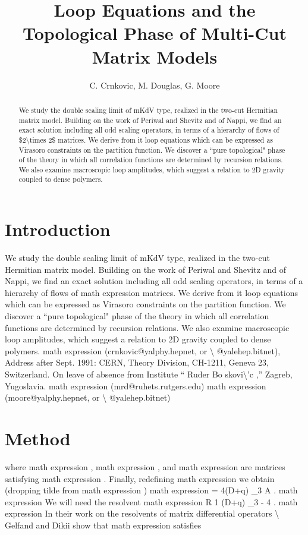 \documentclass[11pt]{article}
\title{Loop Equations and the Topological Phase of Multi-Cut Matrix Models}
\author{C. Crnkovic, M. Douglas, G. Moore}
\date{}
\begin{document}
\maketitle
\begin{abstract}

We study the double scaling limit of mKdV type, realized in the two-cut Hermitian matrix model. Building on the work of Periwal and Shevitz and of Nappi, we find an exact solution including all odd scaling operators, in terms of a hierarchy of flows of \$2\textbackslash{}times 2\$ matrices. We derive from it loop equations which can be expressed as Virasoro constraints on the partition function. We discover a ``pure topological" phase of the theory in which all correlation functions are determined by recursion relations. We also examine macroscopic loop amplitudes, which suggest a relation to 2D gravity coupled to dense polymers.

\end{abstract}

\section{Introduction}

We study the double scaling limit of mKdV type, realized in the two-cut Hermitian matrix model. Building on the work of Periwal and Shevitz and of Nappi, we find an exact solution including all odd scaling operators, in terms of a hierarchy of flows of math expression matrices. We derive from it loop equations which can be expressed as Virasoro constraints on the partition function. We discover a ``pure topological" phase of the theory in which all correlation functions are determined by recursion relations. We also examine macroscopic loop amplitudes, which suggest a relation to 2D gravity coupled to dense polymers. math expression (crnkovic@yalphy.hepnet, or \textbackslash{} @yalehep.bitnet), Address after Sept. 1991: CERN, Theory Division, CH-1211, Geneva 23, Switzerland. On leave of absence from Institute `` Ruder Bo skovi\textbackslash{}'c ,'' Zagreb, Yugoslavia. math expression (mrd@ruhets.rutgers.edu) math expression (moore@yalphy.hepnet, or \textbackslash{} @yalehep.bitnet)

\section{Method}

where math expression , math expression , and math expression are matrices satisfying math expression . Finally, redefining math expression we obtain (dropping tilde from math expression ) math expression = 4(D+q) \_3 A . math expression We will need the resolvent math expression R 1 (D+q) \_3 - 4 . math expression In their work on the resolvents of matrix differential operators \textbackslash{} Gelfand and Dikii show that math expression satisfies
\end{document}

